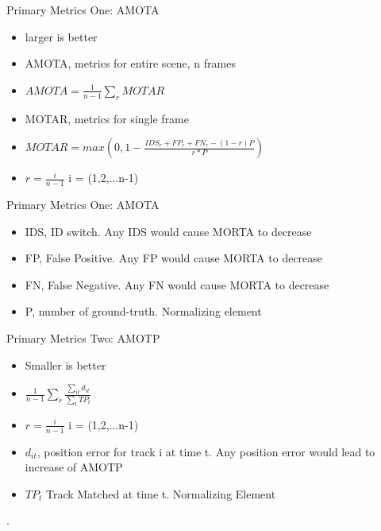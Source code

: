 \begin{frame}{Primary Metrics One: AMOTA}
    \begin{itemize}
    \item{larger is better}
    \item{AMOTA, metrics for entire scene, n frames}
    \item{$AMOTA=\frac{1}{n-1} \sum_r MOTAR$}
    \item{MOTAR, metrics for single frame}
    \item{$MOTAR=max(0,1-\frac{IDS_r+FP_r+FN_r-(1-r)P}{r*P})$}
    \item{$r=\frac{i}{n-1}$ i = (1,2,...n-1)}
    \end{itemize}
    \end{frame}
    
    
    \begin{frame}{Primary Metrics One: AMOTA}
    \begin{itemize}
    \item{IDS, ID switch. Any IDS would cause MORTA to decrease}
    \item{FP, False Positive. Any FP would cause MORTA to decrease}
    \item{FN, False Negative. Any FN would cause MORTA to decrease}
    \item{P, number of ground-truth. Normalizing element}
    \end{itemize}
    \end{frame}
    \begin{frame}{Primary Metrics Two: AMOTP}
    \begin{itemize}
    \item{Smaller is better}
    \item{$\frac{1}{n-1}\sum_r \frac{\sum_{it} d_{it}}{\sum_{t} TP_{t}}$}
    \item{$r=\frac{i}{n-1}$ i = (1,2,...n-1)}
    \item{$d_{it}$, position error for track i at time t. Any position error would lead to increase of AMOTP}
    \item{$TP_{t}$ Track Matched at time t. Normalizing Element}
    \end{itemize}. 
    \end{frame}
